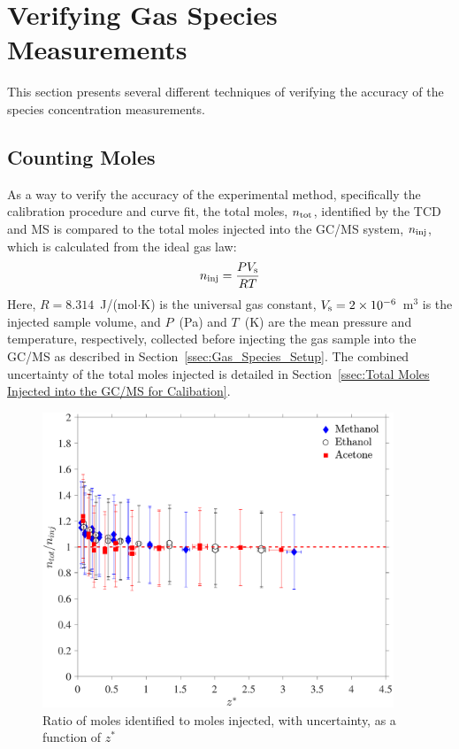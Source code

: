 \documentclass[12pt]{article}
\begin{document}
\clearpage

\section{Verifying Gas Species Measurements}
\label{ssec:Verifying_Vol_Frac_Measurements}

This section presents several different techniques of verifying the accuracy of the species concentration measurements.


\subsection{Counting Moles}

As a way to verify the accuracy of the experimental method, specifically the calibration procedure and curve fit, the total moles, $n_{\rm tot}$, identified by the TCD and MS is compared to the total moles injected into the GC/MS system, $n_{\rm inj}$, which is calculated from the ideal gas law:
\begin{equation}\label{eq:moles_inj}
n_{\rm inj}=\frac{PV_{\rm s}}{RT}
\end{equation}
Here, $R=8.314$~J/(mol$\cdot$K) is the universal gas constant, $V_{\rm s}=2\times 10^{-6}$~m$^3$ is the injected sample volume, and $P$~(Pa) and $T$~(K) are the mean pressure and temperature, respectively, collected before injecting the gas sample into the GC/MS as described in Section~\ref{ssec:Gas_Species_Setup}. The combined uncertainty of the total moles injected is detailed in Section~\ref{ssec:Total Moles Injected into the GC/MS for Calibation}.

\begin{figure}[h!]
	\centering
\includegraphics[width=10.5cm,keepaspectratio]{mole_ratio_Comparison.pdf}
	\caption[Ratio of moles identified to moles injected]{Ratio of moles identified to moles injected, with uncertainty, as a function of $z^*$}
	\label{fig:Mole_Comp}
\end{figure}
\end{document}
